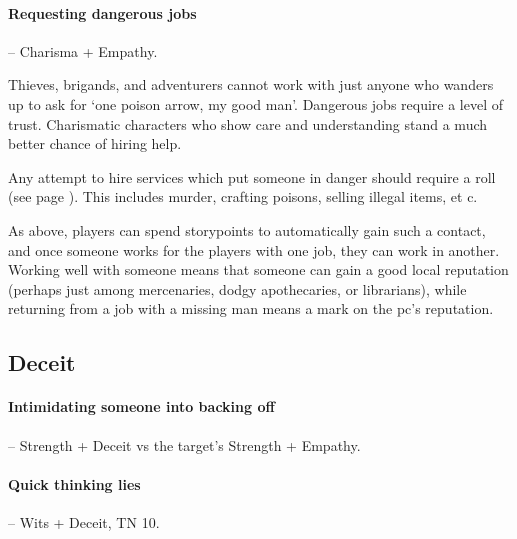 \begin{multicols}{2}
\paragraph{Requesting dangerous jobs} -- Charisma + Empathy.


Thieves, brigands, and \iftoggle{aif}{illegal}{} adventurers cannot work with just anyone who wanders up to ask for `one poison arrow, my good man'.
Dangerous jobs require a level of trust.
Charismatic characters who show care and understanding stand a much better chance of hiring help.

Any attempt to hire services which put someone in danger should require a roll (see page \pageref{services}).
This includes murder, crafting poisons, selling illegal items, et c.

As above, players can spend \glspl{storypoint} to automatically gain such a contact, and once someone works for the players with one job, they can work in another.
Working well with someone means that someone can gain a good local reputation (perhaps just among mercenaries, dodgy apothecaries, or librarians), while returning from a job with a missing man means a mark on the \gls{pc}'s reputation.

\subsection{Deceit}

\paragraph{Intimidating someone into backing off} -- Strength + Deceit vs the target's Strength + Empathy.

\paragraph{Quick thinking lies} -- Wits + Deceit, TN 10.


\end{multicols}
